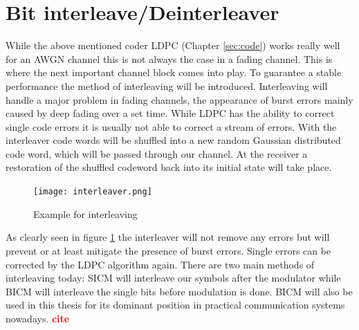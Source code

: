 \documentclass[12pt,oneside, reqno]{report}
\newcommand\boldred[1]{\textcolor{red}{\textbf{#1}}}
\begin{document}
\section{Bit interleave/Deinterleaver}
\label{sec:BIC}
While the above mentioned coder \gls{LDPC}  (Chapter \ref{sec:code}) works really well for an AWGN channel this is not always the case in a fading channel. This is where the next important channel block comes into play. To guarantee a stable performance the method of interleaving will be introduced. Interleaving will handle a major problem in fading channels, the appearance of burst errors mainly caused by deep fading over a set time. While \gls{LDPC} has the ability to correct single code errors it is usually not able to correct a stream of errors. With the interleaver code words will be shuffled into a new random Gaussian distributed code word, which will be passed through our channel. At the receiver a restoration of the shuffled codeword back into its initial state will take place.
\begin{figure}[H]
	\centering
	\texttt{[image: interleaver.png]}
	\caption{Example for interleaving}
	\label{fig:interleaver}
\end{figure}
As clearly seen in figure \ref{fig:interleaver} the interleaver will not remove any errors but will prevent or at least mitigate the presence of burst errors. Single errors can be corrected by the LDPC algorithm again.
There are two main methods of interleaving today: 
\gls{SICM} will interleave our symbols after the modulator while \gls{BICM} will interleave the single bits before modulation is done. BICM will also be used in this thesis for its dominant position in practical communication systems nowadays. \boldred{cite}
\newpage
\end{document}

